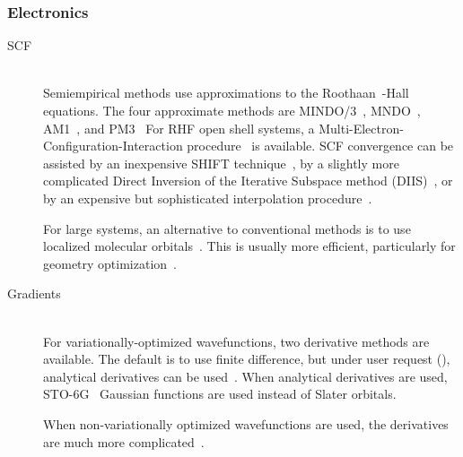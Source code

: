 \subsubsection*{Electronics}
\begin{description}
\item[SCF]~\\
Semiempirical methods use approximations to the
Roothaan~\cite{roothaan}-Hall~\cite{hall} equations.  The four approximate
methods are MINDO/3~\cite{mindo3}, MNDO~\cite{mndo1}, AM1~\cite{am1}, and
PM3~\cite{pm3-1} For RHF open shell systems, a
Multi-Electron-Configuration-Interaction procedure~\cite{meci} is available.
SCF convergence can be assisted by an inexpensive  SHIFT
technique~\cite{shift},  by a slightly more complicated Direct Inversion of the
Iterative Subspace  method (DIIS)~\cite{diis}, or by an expensive but
sophisticated interpolation  procedure~\cite{king}.

For large systems, an alternative to conventional methods is to use localized
molecular orbitals~\cite{mozyme}.  This is usually more efficient, particularly
for geometry optimization~\cite{crambin}.

\item[Gradients]~\\
For variationally-optimized wavefunctions, two derivative methods are
available.  The default is to use finite difference, but under user request
(), analytical derivatives can be used~\cite{analyt}. When
analytical derivatives are used, STO-6G~\cite{sto-6g} Gaussian functions are
used instead of Slater orbitals.

When non-variationally optimized wavefunctions are used, the derivatives
are much more complicated~\cite{analci}.
\end{description}
